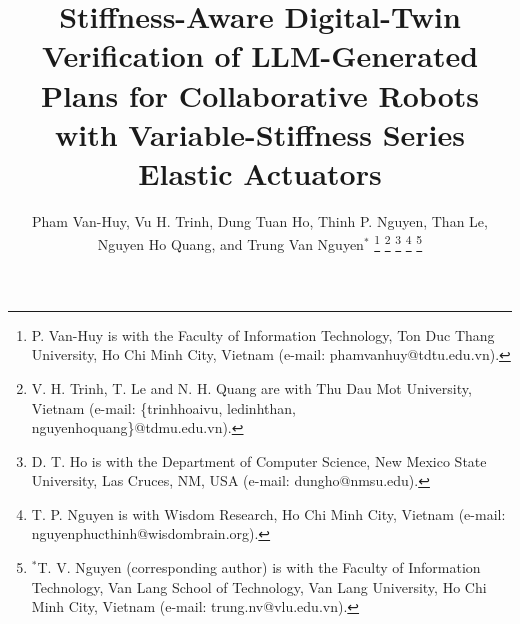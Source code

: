 \documentclass[journal]{IEEEtran}
\begin{document}
\title{Stiffness-Aware Digital-Twin Verification of LLM-Generated Plans for Collaborative Robots with Variable-Stiffness Series Elastic Actuators}

\author{Pham Van-Huy, Vu H. Trinh, Dung Tuan Ho, Thinh P. Nguyen, Than Le, Nguyen Ho Quang, and Trung Van Nguyen$^{*}$
\thanks{P. Van-Huy is with the Faculty of Information Technology, Ton Duc Thang University, Ho Chi Minh City, Vietnam (e-mail: phamvanhuy@tdtu.edu.vn).}
\thanks{V. H. Trinh, T. Le and N. H. Quang are with Thu Dau Mot University, Vietnam (e-mail: \{trinhhoaivu, ledinhthan, nguyenhoquang\}@tdmu.edu.vn).}
\thanks{D. T. Ho is with the Department of Computer Science, New Mexico State University, Las Cruces, NM, USA (e-mail: dungho@nmsu.edu).}
\thanks{T. P. Nguyen is with Wisdom Research, Ho Chi Minh City, Vietnam (e-mail: nguyenphucthinh@wisdombrain.org).}
\thanks{$^{*}$T. V. Nguyen (corresponding author) is with the Faculty of Information Technology, Van Lang School of Technology, Van Lang University, Ho Chi Minh City, Vietnam (e-mail: trung.nv@vlu.edu.vn).}}

\maketitle
\end{document}
